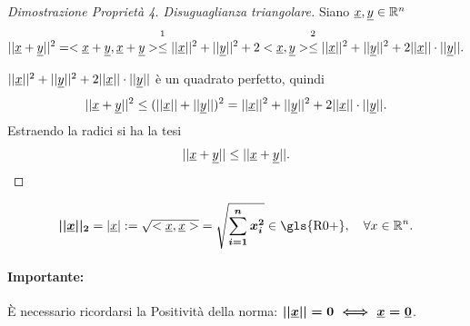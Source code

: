 \begin{proof}[Dimostrazione Proprietà 4. Disuguaglianza triangolare]
	Siano $\uline x,\uline y\in\mathbb R^n$
	\begin{equation*}
		||\uline x+\uline y||^2=<\uline x+\uline y, \uline x+\uline y>\overset{\footnotemark}{\leq}||\uline x||^2+||\uline y||^2+2<\uline x,\uline y>\overset{\footnotemark}{\leq}||\uline x||^2+||\uline y||^2+2||\uline x||\cdot||\uline y||.
	\end{equation*}
	\addtocounter{footnote}{-1}
	
	\noindent $||\uline x||^2+||\uline y||^2+2||\uline x||\cdot||\uline y||$ è un \gls{quadrato perfetto}, quindi
	\begin{equation*}
		||\uline x+\uline y||^2\leq (||\uline x||+||\uline y||)^2=||\uline x||^2+||\uline y||^2+2||\uline x||\cdot||\uline y||.
	\end{equation*}
	Estraendo la radici si ha la tesi
	\begin{equation*}
		||\uline x+\uline y||\leq ||\uline x+\uline y||.
	\end{equation*}
\end{proof}

\begin{definition}
    \begin{equation}
        \boldsymbol{||\uline x||_2}=|\uline x|:=\sqrt{<\uline x,\uline x>}=\boldsymbol{\sqrt{\sum_{i=1}^n x_i^2}}\in\text{\gls{R0+}},\quad \forall x\in\mathbb R^n.
    \end{equation}
\end{definition}

\paragraph{Importante:} È necessario ricordarsi la Positività della norma: $\boldsymbol{||\uline x||=0\iff\uline x=\uline 0}$.

